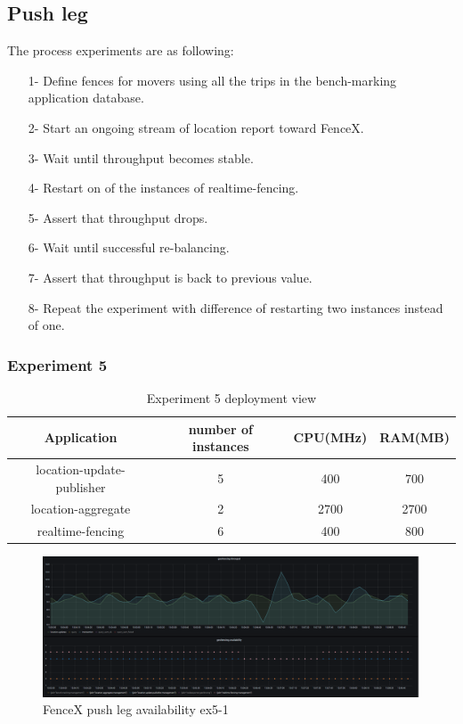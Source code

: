 \documentclass[a4]{report}
\begin{document}
    \subsection{Push leg}
    The process experiments are as following:
    \begin{itemize}
        \item[1-] Define fences for movers using all the trips in the bench-marking application database.
        \item[2-] Start an ongoing stream of location report toward FenceX.
        \item[3-] Wait until throughput becomes stable.
        \item[4-] Restart on of the instances of realtime-fencing.
        \item[5-] Assert that throughput drops.
        \item[6-] Wait until successful re-balancing.
        \item[7-] Assert that throughput is back to previous value.
        \item[8-] Repeat the experiment with difference of restarting two instances instead of one.
    \end{itemize}


    \clearpage

    \subsubsection{Experiment 5}
    \begin{table}[h!]
        \centering
        \begin{tabular}{|c|c|c|c|}
            \hline
            Application               & number of instances & CPU(MHz) & RAM(MB) \\
            \hline
            location-update-publisher & 5                   & 400      & 700     \\
            location-aggregate        & 2                   & 2700     & 2700    \\
            realtime-fencing          & 6                   & 400      & 800     \\
            \hline
        \end{tabular}
        \caption{Experiment 5 deployment view}
        \label{table:ex5-dv}
    \end{table}
    
    \begin{figure}[h!]
        \caption{FenceX push leg availability ex5-1}
        \label{fig:ex5-1}
        \includegraphics[scale=0.4]{images/evaluation/ex5-benchmarking-ongoing-2per6sec.png}
    \end{figure}
\end{document}
